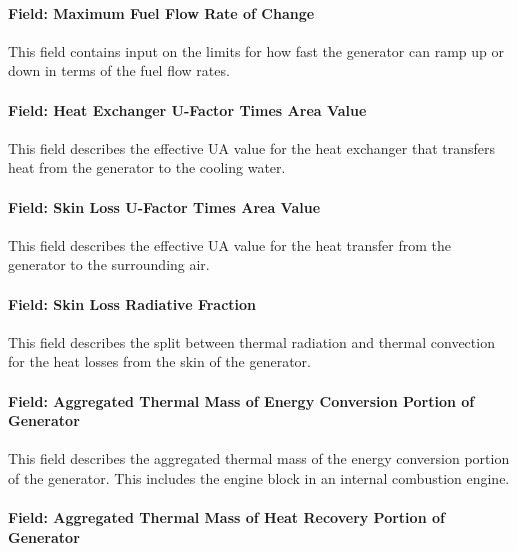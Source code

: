 \paragraph{Field: Maximum Fuel Flow Rate of Change}\label{field-maximum-fuel-flow-rate-of-change}

This field contains input on the limits for how fast the generator can ramp up or down in terms of the fuel flow rates.

\paragraph{Field: Heat Exchanger U-Factor Times Area Value}\label{field-heat-exchanger-u-factor-times-area-value-000}

This field describes the effective UA value for the heat exchanger that transfers heat from the generator to the cooling water.

\paragraph{Field: Skin Loss U-Factor Times Area Value}\label{field-skin-loss-u-factor-times-area-value}

This field describes the effective UA value for the heat transfer from the generator to the surrounding air.

\paragraph{Field: Skin Loss Radiative Fraction}\label{field-skin-loss-radiative-fraction}

This field describes the split between thermal radiation and thermal convection for the heat losses from the skin of the generator.

\paragraph{Field: Aggregated Thermal Mass of Energy Conversion Portion of Generator}\label{field-aggregated-thermal-mass-of-energy-conversion-portion-of-generator}

This field describes the aggregated thermal mass of the energy conversion portion of the generator. This includes the engine block in an internal combustion engine.

\paragraph{Field: Aggregated Thermal Mass of Heat Recovery Portion of Generator}\label{field-aggregated-thermal-mass-of-heat-recovery-portion-of-generator}

